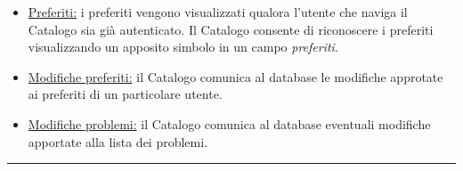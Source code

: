 \documentclass[11pt, a4paper]{article}
\theoremstyle{definition} %
\begin{document}
\begin{description}
\begin{itemize}
        \item \underline{Preferiti:} i preferiti vengono visualizzati qualora
        l'utente che naviga il Catalogo sia già autenticato. Il Catalogo consente
        di riconoscere i preferiti visualizzando un apposito simbolo in un campo
        \textit{preferiti}.

        \item \underline{Modifiche preferiti:} il Catalogo comunica al database le
        modifiche approtate ai preferiti di un particolare utente.

        \item \underline{Modifiche problemi:} il Catalogo comunica al database eventuali
        modifiche apportate alla lista dei problemi.
    \end{itemize}
\end{description}

\begin{center}
    \rule{5cm}{1pt}
\end{center}
\end{document}
